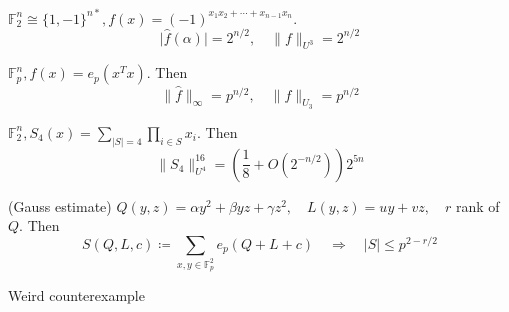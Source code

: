 \begin{example} $\mathbb{F}_2^n \cong \{1,-1\}^{n*}, f(x) = (-1)^{x_1x_2 + \cdots + x_{n-1}x_{n}} $.
\[
\lvert \hat{f}(\alpha ) \rvert = 2 ^{n/2}, \quad \lVert f \rVert _{U^3} = 2^{n/2}
\]
\end{example}

\begin{example} $ \mathbb{F}_p^{n}, f(x) = e_p(x^Tx)$. Then 
\[
\lVert \hat{f} \rVert_{\infty} = p^{n/2}, \quad  \lVert f \rVert_{U_3} = p^{n/2}
\]
\end{example}

\begin{example} $\mathbb{F}_2^{n}, S_4(x) = \sum_{\lvert S \rvert = 4 } \prod_{i \in S} x_i$. Then
\[
\lVert S_4 \rVert _{U^4}^{16} = \left( \frac{1}{8} + O(2^{-n/2}) \right)2^{5n}
\]
\end{example}

\begin{proposition} (Gauss estimate) $Q(y,z) = \alpha y^2 + \beta yz + \gamma z^2, \quad L(y,z) = uy + vz, \quad r$ rank of $Q$. Then
\[
S(Q, L, c) \coloneqq  \sum_{x, y \in \mathbb{F}_p^2} e_p(Q+L+c) \quad  \Rightarrow  \quad  \lvert S \rvert \leq p^{2-r/2}
\]
\end{proposition}

\begin{example}
Weird counterexample
\end{example}